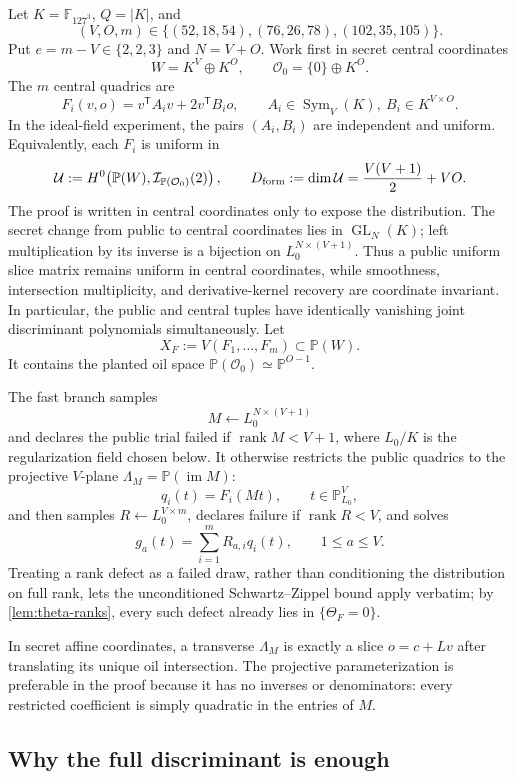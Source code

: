 \documentclass[10pt,a4paper]{article}
\newcommand{\F}{\mathbb F}
\newcommand{\PP}{\mathbb P}
\newcommand{\cO}{\mathcal O}
\newcommand{\cU}{\mathcal U}
\newcommand{\rank}{\operatorname{rank}}
\newcommand{\Sym}{\operatorname{Sym}}
\begin{document}
Let $K=\F_{127^3}$, $Q=|K|$, and
\[
(V,O,m)\in\{(52,18,54),(76,26,78),(102,35,105)\}.
\]
Put $e=m-V\in\{2,2,3\}$ and $N=V+O$.  Work first in secret central coordinates
\[
W=K^V\oplus K^O,
\qquad
\cO_0=\{0\}\oplus K^O.
\]
The $m$ central quadrics are
\begin{equation}\label{eq:central-slice}
F_i(v,o)=v^{\mathsf T}A_i v+2v^{\mathsf T}B_i o,
\qquad
A_i\in\Sym_V(K),\ B_i\in K^{V\times O}.
\end{equation}
In the ideal-field experiment, the pairs $(A_i,B_i)$ are independent and uniform.  Equivalently, each $F_i$ is uniform in
\[
\cU:=H^0\!\left(\PP(W),\mathcal I_{\PP(\cO_0)}(2)\right),
\qquad
D_{\rm form}:=\dim\cU=\frac{V(V+1)}2+VO.
\]
The proof is written in central coordinates only to expose the distribution.  The secret change from public to central coordinates lies in $\operatorname{GL}_N(K)$; left multiplication by its inverse is a bijection on $L_0^{N\times(V+1)}$.  Thus a public uniform slice matrix remains uniform in central coordinates, while smoothness, intersection multiplicity, and derivative-kernel recovery are coordinate invariant.  In particular, the public and central tuples have identically vanishing joint discriminant polynomials simultaneously.
Let
\[
X_F:=V(F_1,\ldots,F_m)\subset\PP(W).
\]
It contains the planted oil space $\PP(\cO_0)\simeq\PP^{O-1}$.

The fast branch samples
\[
M\leftarrow L_0^{N\times(V+1)}
\]
and declares the public trial failed if $\rank M<V+1$, where $L_0/K$ is the regularization field chosen below.  It otherwise restricts the public quadrics to the projective $V$-plane $\Lambda_M=\PP(\operatorname{im}M)$:
\[
q_i(t)=F_i(Mt),\qquad t\in\PP^V_{L_0},
\]
and then samples $R\leftarrow L_0^{V\times m}$, declares failure if $\rank R<V$, and solves
\[
g_a(t)=\sum_{i=1}^m R_{a,i}q_i(t),\qquad 1\le a\le V.
\]
Treating a rank defect as a failed draw, rather than conditioning the distribution on full rank, lets the unconditioned Schwartz--Zippel bound apply verbatim; by \cref{lem:theta-ranks}, every such defect already lies in $\{\Theta_F=0\}$.

In secret affine coordinates, a transverse $\Lambda_M$ is exactly a slice $o=c+Lv$ after translating its unique oil intersection.  The projective parameterization is preferable in the proof because it has no inverses or denominators: every restricted coefficient is simply quadratic in the entries of $M$.

\subsection{Why the full discriminant is enough}
\end{document}
